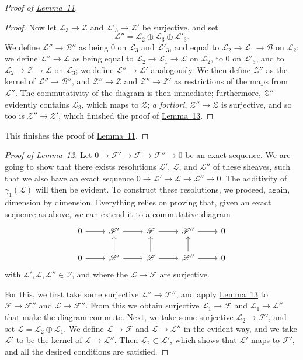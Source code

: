 \documentclass{article}
\newcommand{\scr}[1]{{\mathscr{#1}}}
\renewcommand{\cal}[1]{{\mathcal{#1}}}
\begin{document}
\begin{proof}[Proof of {\hyperref[lemma11]{Lemma~11}}]
\begin{proof}
    Now let $\scr{L}_3\to\scr{Z}$ and $\scr{L}'_3\to\scr{Z}'$ be surjective, and set
    \[
      \scr{L}'' = \scr{L}_2\oplus\scr{L}_3\oplus\scr{L}'_3.
    \]
    We define $\scr{L}''\to\scr{B}''$ as being $0$ on $\scr{L}_3$ and $\scr{L}'_3$, and equal to $\scr{L}_2\to\scr{L}_1\to\scr{B}$ on $\scr{L}_2$;
    we define $\scr{L}''\to\scr{L}$ as being equal to $\scr{L}_2\to\scr{L}_1\to\scr{L}$ on $\scr{L}_2$, to $0$ on $\scr{L}'_3$, and to $\scr{L}_2\to\scr{Z}\to\scr{L}$ on $\scr{L}_3$;
    we define $\scr{L}''\to\scr{L}'$ analogously.
    We then define $\scr{Z}''$ as the kernel of $\scr{L}''\to\scr{B}''$, and $\scr{Z}''\to\scr{Z}$ and $\scr{Z}''\to\scr{Z}'$ as restrictions of the maps from $\scr{L}''$.
    The commutativity of the diagram is then immediate;
    furthermore, $\scr{Z}''$ evidently contains $\scr{L}_3$, which maps to $\scr{Z}$;
    \emph{a fortiori}, $\scr{Z}''\to\scr{Z}$ is surjective, and so too is $\scr{Z}''\to\scr{Z}'$, which finished the proof of \hyperref[lemma13]{Lemma~13}.
  \end{proof}
  This finishes the proof of \hyperref[lemma11]{Lemma~11}.
\end{proof}

\begin{proof}[Proof of {\hyperref[lemma12]{Lemma~12}}]
  Let $0\to\scr{F}'\to\scr{F}\to\scr{F}''\to0$ be an exact sequence.
  We are going to show that there exists resolutions $\scr{L}'$, $\scr{L}$, and $\scr{L}''$ of these sheaves, such that we also have an exact sequence $0\to\scr{L}'\to\scr{L}\to\scr{L}''\to0$.
  The additivity of $\gamma_1(\scr{L})$ will then be evident.
  To construct these resolutions, we proceed, again, dimension by dimension.
  Everything relies on proving that, given an exact sequence as above, we can extend it to a commutative diagram
  \[
    \begin{tikzcd}
      0 \rar
      & \scr{F}' \rar
      & \scr{F} \rar
      & \scr{F}'' \rar
      & 0
    \\0 \rar
      & \scr{L}' \rar\uar
      & \scr{L} \rar\uar
      & \scr{L}'' \rar\uar
      & 0
    \end{tikzcd}
  \]
  with $\scr{L}',\scr{L},\scr{L}''\in\cal{V}$, and where the $\scr{L}\to\scr{F}$ are surjective.

  For this, we first take some surjective $\scr{L}''\to\scr{F}''$, and apply \hyperref[lemma13]{Lemma~13} to $\scr{F}\to\scr{F}''$ and $\scr{L}\to\scr{F}''$.
  From this we obtain surjective $\scr{L}_1\to\scr{F}$ and $\scr{L}_1\to\scr{L}''$ that make the diagram commute.
  Next, we take some surjective $\scr{L}_2\to\scr{F}'$, and set $\scr{L}=\scr{L}_2\oplus\scr{L}_1$.
  We define $\scr{L}\to\scr{F}$ and $\scr{L}\to\scr{L}''$ in the evident way, and we take $\scr{L}'$ to be the kernel of $\scr{L}\to\scr{L}''$.
  Then $\scr{L}_2\subset\scr{L}'$, which shows that $\scr{L}'$ maps to $\scr{F}'$, and all the desired conditions are satisfied.
\end{proof}
\end{document}
